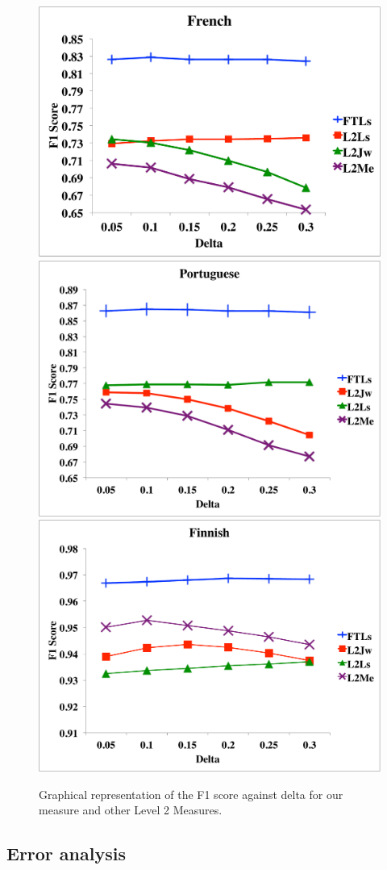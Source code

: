 \documentclass[10pt, a4paper]{article}
\begin{document}
\begin{figure}
\centering
\includegraphics[width=.55\columnwidth]{french}
\includegraphics[width=.55\columnwidth]{portuguese}
\includegraphics[width=.55\columnwidth]{finnish}
\caption{Graphical representation of the F1 score against delta for our measure and other Level 2 Measures.}
\label{fig.2}
\end{figure}

\subsection{Error analysis}
\end{document}
